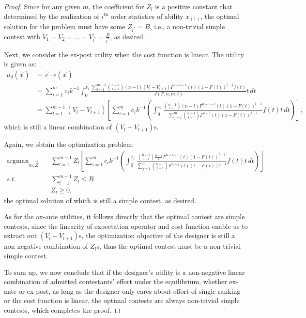 \begin{proof}
    Since for any given $m$, the coefficient for $Z_l$ is a positive constant that determined by the realization of $i^\text{th}$ order statistics of ability $x_{(1)}$, the optimal solution for the problem must have some $Z_{l^*}=B$, i.e., a non-trivial simple contest with $V_1=V_2=\ldots=V_{l^*}=\frac{B}{l^*}$, as desired. 

    Next, we consider the ex-post utility when the cost function is linear. The utility is given as: 
    \[
    \begin{aligned}
        u_d(\vec{x})  & =\vec{c}\cdot e(\vec{x}) \\
             & = \sum_{i=1}^{m}c_ik^{-1}\int_{0}^{x_i}\frac{\sum_{l=1}^{m-1}\binom{n-1}{l-1}(n-l)(V_l-V_{l+1})F^{n-l-1}(t)(1-F(t))^{l-1}f(t)}{J(F,n,m,t)} t\, dt \\
             & = \sum_{l=1}^{m-1}(V_l-V_{l+1}) \left [ \sum_{i=1}^{m} c_ik^{-1} \left ( \int_{0}^{x_{i}}\frac{\binom{n-1}{l-1}(n-l)F^{n-l-1}(t)(1-F(t))^{l-1}}{\sum_{j=1}^{m}\binom{n-1}{j-1}F^{n-j}(t)(1-F(t))^{j-1}}f(t) t \, dt \right ) \right ],
    \end{aligned}
    \]
    which is still a linear combination of $(V_l-V_{l+1})$s. 

    Again, we obtain the optimization problem:
    \[
    \begin{aligned}
        \mathop{\arg \max}_{m,\vec{Z}} \quad & \sum_{l=1}^{m-1}Z_l \left [ \sum_{i=1}^{m} c_ik^{-1} \left ( \int_{0}^{x_{i}}\frac{\binom{n-1}{l-1}\frac{n-l}{l}F^{n-l-1}(t)(1-F(t))^{l-1}}{\sum_{j=1}^{m}\binom{n-1}{j-1}F^{n-j}(t)(1-F(t))^{j-1}}f(t) t \, dt \right ) \right ] \\
        s.t. \quad & \sum_{l=1}^{m-1} Z_l \leq B \\
            & Z_l \geq 0,
    \end{aligned}
    \] the optimal solution of which is still a simple contest, as desired. 

    As for the ax-ante utilities, it follows directly that the optimal contest are simple contests, since the linearity of expectation operator and cost function enable us to extract out $(V_l-V_{l+1})$s, the optimization objective of the designer is still a non-negative combination of $Z_l$s, thus the optimal contest must be a non-trivial simple contest. 

    To sum up, we now conclude that if the designer's utility is a non-negative linear combination of admitted contestants' effort under the equilibrium, whether ex-ante or ex-post, as long as the designer only cares about effort of single ranking or the cost function is linear, the optimal contests are always non-trivial simple contests, which completes the proof.  
\end{proof}



